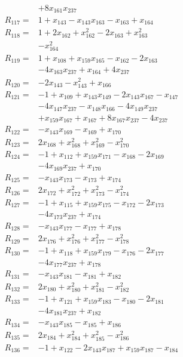 \begin{align*}
&+8x_{161}x_{237}\\[3pt]
R_{117}={}&1 +x_{143} -x_{143}x_{163} -x_{163} +x_{164}\\[3pt]
R_{118}={}&1 +2x_{162} +x_{162}^{2} -2x_{163} +x_{163}^{2}\\
&-x_{164}^{2}\\[3pt]
R_{119}={}&1 +x_{108} +x_{159}x_{165} -x_{162} -2x_{163}\\
&-4x_{163}x_{237} +x_{164} +4x_{237}\\[3pt]
R_{120}={}&-2x_{143} -x_{143}^{2} +x_{166}\\[3pt]
R_{121}={}&-1 +x_{109} +x_{143}x_{149} -2x_{143}x_{167} -x_{147}\\
&-4x_{147}x_{237} -x_{148}x_{166} -4x_{149}x_{237}\\
&+x_{159}x_{167} +x_{167} +8x_{167}x_{237} -4x_{237}\\[3pt]
R_{122}={}&-x_{143}x_{169} -x_{169} +x_{170}\\[3pt]
R_{123}={}&2x_{168} +x_{168}^{2} +x_{169}^{2} -x_{170}^{2}\\[3pt]
R_{124}={}&-1 +x_{112} +x_{159}x_{171} -x_{168} -2x_{169}\\
&-4x_{169}x_{237} +x_{170}\\[3pt]
R_{125}={}&-x_{143}x_{173} -x_{173} +x_{174}\\[3pt]
R_{126}={}&2x_{172} +x_{172}^{2} +x_{173}^{2} -x_{174}^{2}\\[3pt]
R_{127}={}&-1 +x_{115} +x_{159}x_{175} -x_{172} -2x_{173}\\
&-4x_{173}x_{237} +x_{174}\\[3pt]
R_{128}={}&-x_{143}x_{177} -x_{177} +x_{178}\\[3pt]
R_{129}={}&2x_{176} +x_{176}^{2} +x_{177}^{2} -x_{178}^{2}\\[3pt]
R_{130}={}&-1 +x_{118} +x_{159}x_{179} -x_{176} -2x_{177}\\
&-4x_{177}x_{237} +x_{178}\\[3pt]
R_{131}={}&-x_{143}x_{181} -x_{181} +x_{182}\\[3pt]
R_{132}={}&2x_{180} +x_{180}^{2} +x_{181}^{2} -x_{182}^{2}\\[3pt]
R_{133}={}&-1 +x_{121} +x_{159}x_{183} -x_{180} -2x_{181}\\
&-4x_{181}x_{237} +x_{182}\\[3pt]
R_{134}={}&-x_{143}x_{185} -x_{185} +x_{186}\\[3pt]
R_{135}={}&2x_{184} +x_{184}^{2} +x_{185}^{2} -x_{186}^{2}\\[3pt]
R_{136}={}&-1 +x_{122} -2x_{143}x_{187} +x_{159}x_{187} -x_{184}\\

\end{align*}
